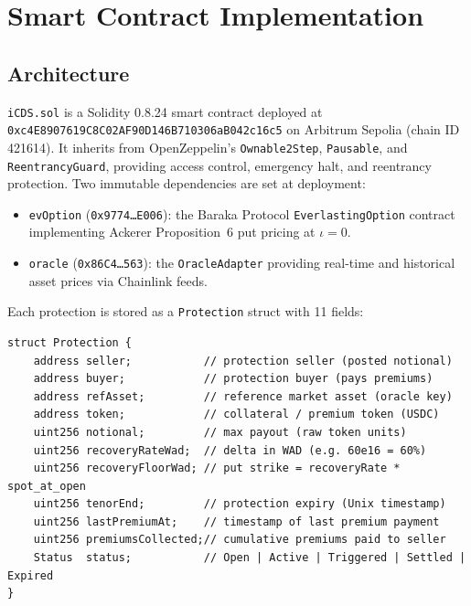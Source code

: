 \documentclass[12pt]{article}
\theoremstyle{plain}
\theoremstyle{definition}
\theoremstyle{remark}
\begin{document}
\section{Smart Contract Implementation}
\label{sec:contract}

\subsection{Architecture}

\texttt{iCDS.sol} is a Solidity 0.8.24 smart contract deployed at
\texttt{0xc4E8907619C8C02AF90D146B710306aB042c16c5} on Arbitrum Sepolia
(chain ID 421614).
It inherits from OpenZeppelin's \texttt{Ownable2Step}, \texttt{Pausable},
and \texttt{ReentrancyGuard}, providing access control, emergency halt,
and reentrancy protection.
Two immutable dependencies are set at deployment:

\begin{itemize}[noitemsep]
  \item \texttt{evOption} (\texttt{0x9774\ldots E006}): the Baraka Protocol
    \texttt{EverlastingOption} contract implementing Ackerer Proposition~6
    put pricing at $\iota=0$.
  \item \texttt{oracle} (\texttt{0x86C4\ldots 563}): the \texttt{OracleAdapter}
    providing real-time and historical asset prices via Chainlink feeds.
\end{itemize}

Each protection is stored as a \texttt{Protection} struct with 11 fields:

\begin{lstlisting}[caption={Protection struct (iCDS.sol)}]
struct Protection {
    address seller;           // protection seller (posted notional)
    address buyer;            // protection buyer (pays premiums)
    address refAsset;         // reference market asset (oracle key)
    address token;            // collateral / premium token (USDC)
    uint256 notional;         // max payout (raw token units)
    uint256 recoveryRateWad;  // delta in WAD (e.g. 60e16 = 60%)
    uint256 recoveryFloorWad; // put strike = recoveryRate * spot_at_open
    uint256 tenorEnd;         // protection expiry (Unix timestamp)
    uint256 lastPremiumAt;    // timestamp of last premium payment
    uint256 premiumsCollected;// cumulative premiums paid to seller
    Status  status;           // Open | Active | Triggered | Settled | Expired
}
\end{lstlisting}
\end{document}
